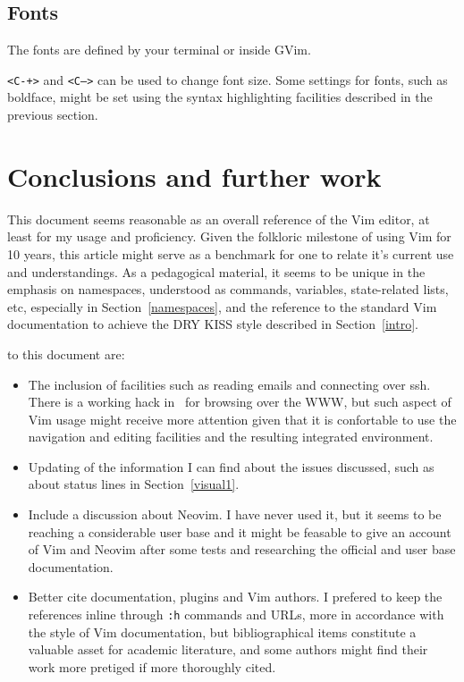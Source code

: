 \documentclass{article}
\newcommand{\ttt}[1] {
	\texttt{<#1>}}
\newcommand{\tttt}[1]{\texttt{#1}}
\begin{document}
\subsection{Fonts}
The fonts are defined by your terminal or inside GVim.
\ttt{C-+} and \ttt{C--} can be used to change font size.
Some settings for fonts, such as boldface, might be set using
the syntax highlighting facilities described in the previous section.

\section{Conclusions and further work}\label{conc}
This document seems reasonable as an overall reference of the Vim editor,
at least for my usage and proficiency.
Given the folkloric milestone of using Vim for 10 years,
this article might serve as a benchmark for one to relate
it's current use and understandings.
As a pedagogical material, it seems to be unique in the emphasis
on namespaces, understood as commands, variables, state-related lists, etc,
especially in Section~\ref{namespaces},
and the reference to the standard Vim documentation
to achieve the DRY KISS style described in Section~\ref{intro}.

 to this document are:
\begin{itemize}
  \item The inclusion of facilities such as reading emails and connecting over ssh.
    There is a working hack in~\cite{vimrc} for browsing over the WWW,
    but such aspect of Vim usage might receive more attention
    given that it is confortable to use the navigation and editing facilities
    and the resulting integrated environment.
  \item Updating of the information I can find about the issues discussed,
    such as about status lines in Section~\ref{visual1}.
  \item Include a discussion about Neovim.
    I have never used it, but it seems to be reaching a considerable user base
    and it might be feasable to give an account of Vim and Neovim
    after some tests and researching the official and user base documentation.
  \item Better cite documentation, plugins and Vim authors.
    I prefered to keep the references inline through \tttt{:h} commands
    and URLs, more in accordance with the style of Vim documentation,
    but bibliographical items constitute a valuable asset for academic literature,
    and some authors might find their work more pretiged if more
    thoroughly cited.
\end{itemize}
\end{document}
